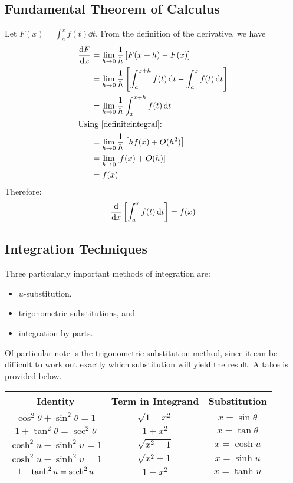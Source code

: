 \documentclass{article}
\begin{document}
\subsection{Fundamental Theorem of Calculus}
Let $F(x) = \int_{a}^{x} f(t) \dd{t}$. From the definition of the derivative, we have
\begin{align*}
	\frac{\dd F}{\dd x} & = \lim_{h \to 0} \frac{1}{h} \left[ F(x+h) - F(x) \right]                                         \\
	                    & = \lim_{h \to 0} \frac{1}{h} \left[ \int_{a}^{x+h} f(t) \dd{t} - \int_{a}^{x} f(t) \dd{t} \right] \\
	                    & = \lim_{h \to 0} \frac{1}{h} \int_{x}^{x+h} f(t) \dd{t}                                           \\
	\intertext{Using \eqref{definiteintegral}:}
	                    & = \lim_{h \to 0} \frac{1}{h} \left[ hf(x) + O(h^2) \right]                                        \\
	                    & = \lim_{h \to 0} \left[ f(x) + O(h) \right]                                                       \\
	                    & = f(x)
\end{align*}
Therefore:
\begin{equation}\label{ftc}
	\frac{\mathrm{d}}{\dd x} \left[ \int_{a}^{x} f(t) \dd{t} \right] = f(x)
\end{equation}

\subsection{Integration Techniques}
Three particularly important methods of integration are:
\begin{itemize}
	\item $u$-substitution,
	\item trigonometric substitutions, and
	\item integration by parts.
\end{itemize}
Of particular note is the trigonometric substitution method, since it can be difficult to work out exactly which substitution will yield the result. A table is provided below.

\medskip\noindent\begin{tabular}{c c c}
	Identity                            & Term in Integrand & Substitution      \\\hline
	$\cos^2 \theta + \sin^2 \theta = 1$ & $\sqrt{1 - x^2}$  & $x = \sin \theta$ \\
	$1 + \tan^2 \theta = \sec^2 \theta$ & $1 + x^2$         & $x = \tan \theta$ \\
	$\cosh^2 u - \sinh^2 u = 1$         & $\sqrt{x^2 - 1}$  & $x = \cosh u$     \\
	$\cosh^2 u - \sinh^2 u = 1$         & $\sqrt{x^2 + 1}$  & $x = \sinh u$     \\
	$1 - \tanh^2 u = \sech^2 u$         & $1 - x^2$         & $x = \tanh u$
\end{tabular}
\end{document}

